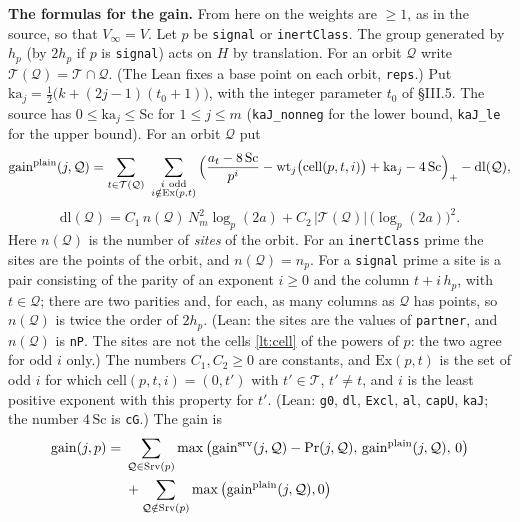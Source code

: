 \documentclass[11pt,letterpaper]{article}
\begin{document}
\textbf{The formulas for the gain.} From here on the weights are $\ge1$, as in the source, so that
$V_\infty=V$. Let $p$ be \texttt{signal} or \texttt{inertClass}. The group generated by $h_p$ (by $2h_p$
if $p$ is \texttt{signal}) acts on $H$ by translation. For an orbit $\mathcal Q$ write
$\mathcal T(\mathcal Q)=\mathcal T\cap\mathcal Q$. (The Lean fixes a base point on each orbit,
\texttt{reps}.) Put $\mathrm{ka}_j=\frac12\big(k+(2j-1)(t_0+1)\big)$, with the integer parameter $t_0$ of
\S III.5. The source has $0\le\mathrm{ka}_j\le\mathrm{Sc}$ for $1\le j\le m$ (\texttt{kaJ\_nonneg} for the lower
bound, \texttt{kaJ\_le} for the upper bound). For an
orbit $\mathcal Q$ put
\begin{equation}\label{lt:g0}
 \mathrm{gain}^{\rm plain}(j,\mathcal Q)=\sum_{t\in\mathcal T(\mathcal Q)}\
 \sum_{\substack{i\ \mathrm{odd}\\ i\notin\mathrm{Ex}(p,t)}}
 \Big(\frac{a_t-8\,\mathrm{Sc}}{p^i}-\mathrm{wt}_j\big(\mathrm{cell}(p,t,i)\big)+\mathrm{ka}_j-4\,\mathrm{Sc}\Big)_+
 -\mathrm{dl}(\mathcal Q),
\end{equation}
\begin{equation}\label{lt:dl}
 \mathrm{dl}(\mathcal Q)=C_1\,n(\mathcal Q)\,N_m^2\log_p(2a)+C_2\,|\mathcal T(\mathcal Q)|\,\big(\log_p(2a)\big)^2 .
\end{equation}
Here $n(\mathcal Q)$ is the number of \emph{sites} of the orbit. For an \texttt{inertClass} prime the
sites are the points of the orbit, and $n(\mathcal Q)=n_p$. For a \texttt{signal} prime a site is a pair
consisting of the parity of an exponent $i\ge0$ and the column $t+i\,h_p$, with $t\in\mathcal Q$; there are
two parities and, for each, as many columns as $\mathcal Q$ has points, so $n(\mathcal Q)$ is twice the
order of $2h_p$. (Lean: the sites are the values of \texttt{partner}, and $n(\mathcal Q)$ is \texttt{nP}.
The sites are not the cells \eqref{lt:cell} of the powers of $p$: the two agree for odd $i$ only.) The
numbers $C_1,C_2\ge0$ are constants, and $\mathrm{Ex}(p,t)$ is the set
of odd $i$ for which $\mathrm{cell}(p,t,i)=(0,t')$ with $t'\in\mathcal T$, $t'\ne t$, and $i$ is the least
positive exponent with this property for $t'$. (Lean: \texttt{g0}, \texttt{dl}, \texttt{Excl}, \texttt{al},
\texttt{capU}, \texttt{kaJ}; the number $4\,\mathrm{Sc}$ is \texttt{cG}.) The gain is
\begin{equation}\label{lt:gainP}
\begin{aligned}
 \mathrm{gain}(j,p)={}&\sum_{\mathcal Q\in\mathrm{Srv}(p)}
   \max\big(\mathrm{gain}^{\rm srv}(j,\mathcal Q)-\mathrm{Pr}(j,\mathcal Q),\,\mathrm{gain}^{\rm plain}(j,\mathcal Q),\,0\big)\\
   &+\sum_{\mathcal Q\notin\mathrm{Srv}(p)}\max\big(\mathrm{gain}^{\rm plain}(j,\mathcal Q),0\big)
\end{aligned}
\end{equation}
\end{document}
